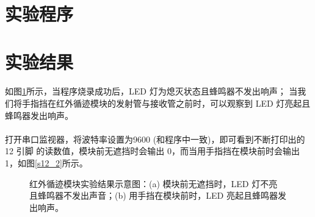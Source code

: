 \documentclass[UTF8, oneside]{ctexbook}
\begin{document}
\section{实验程序}


\section{实验结果}
\paragraph{}
如图\ref{s12_1}所示，当程序烧录成功后，LED 灯为熄灭状态且蜂鸣器不发出响声；
当我们将手指挡在红外循迹模块的发射管与接收管之前时，可以观察到 LED 灯亮起且
蜂鸣器发出响声。

\paragraph{}
打开串口监视器，将波特率设置为9600 (和程序中一致)，即可看到不断打印出的 12 引脚
的读数值，模块前无遮挡时会输出 0，而当用手指挡在模块前时会输出 1，如图\ref{s12_2}所示。
\newpage

\begin{figure}[h]
    \centering


    \centering
    \caption{红外循迹模块实验结果示意图：(a) 模块前无遮挡时，LED 灯不亮
    且蜂鸣器不发出声音；(b) 用手挡在模块前时，LED 亮起且蜂鸣器发出响声。}
    \label{s12_1}
    
\end{figure}
\end{document}

